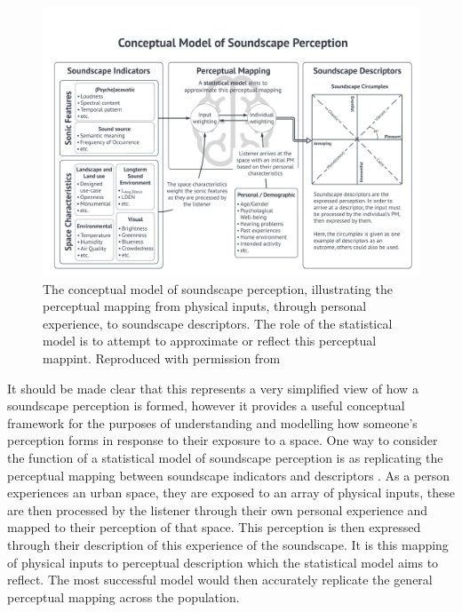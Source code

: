 \documentclass[
  authoryear,
  preprint,
  1p]{elsarticle}
\begin{document}
\begin{figure}

{\centering \includegraphics{Overall_Model_Concept_Diagram_2022-04-28.png}

}

\caption{\label{fig-model}The conceptual model of soundscape perception,
illustrating the perceptual mapping from physical inputs, through
personal experience, to soundscape descriptors. The role of the
statistical model is to attempt to approximate or reflect this
perceptual mappint. Reproduced with permission from
\citet{Mitchell2022Predictive}}

\end{figure}

It should be made clear that this represents a very simplified view of
how a soundscape perception is formed, however it provides a useful
conceptual framework for the purposes of understanding and modelling how
someone's perception forms in response to their exposure to a space. One
way to consider the function of a statistical model of soundscape
perception is as replicating the perceptual mapping between soundscape
indicators and descriptors \citep{Lionello2021new}. As a person
experiences an urban space, they are exposed to an array of physical
inputs, these are then processed by the listener through their own
personal experience and mapped to their perception of that space. This
perception is then expressed through their description of this
experience of the soundscape. It is this mapping of physical inputs to
perceptual description which the statistical model aims to reflect. The
most successful model would then accurately replicate the general
perceptual mapping across the population.
\end{document}
